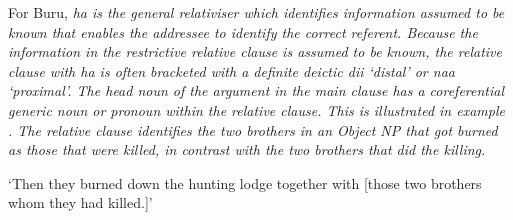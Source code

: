 
For Buru,
\it{ha} is the general relativiser which identifies information
assumed to be known that enables the addressee to identify the correct referent.
Because the information in the restrictive relative clause is
assumed to be known,
the relative clause with \it{ha} is often bracketed with a definite
deictic \it{dii} ‘distal’ or \it{naa} ‘proximal’.
The head noun of the argument in the main clause has a coreferential
generic noun or pronoun within the relative clause.
This is illustrated in example .
The relative clause identifies the two brothers in an Object
NP that got burned as those that were killed,
in contrast with the two brothers that did the killing.

\begin{exe}\setcounter{xnumi}{23}
			\glt	‘Then they burned down the hunting lodge together with [those two brothers whom they had killed.]’ 
						\label{ex:13-24}
\end{exe}

